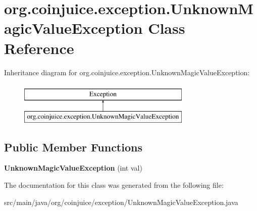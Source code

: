 \hypertarget{classorg_1_1coinjuice_1_1exception_1_1_unknown_magic_value_exception}{\section{org.\-coinjuice.\-exception.\-Unknown\-Magic\-Value\-Exception Class Reference}
\label{classorg_1_1coinjuice_1_1exception_1_1_unknown_magic_value_exception}
}
Inheritance diagram for org.\-coinjuice.\-exception.\-Unknown\-Magic\-Value\-Exception\-:\begin{figure}[H]
\begin{center}
\leavevmode
\includegraphics[height=2.000000cm]{classorg_1_1coinjuice_1_1exception_1_1_unknown_magic_value_exception}
\end{center}
\end{figure}
\subsection*{Public Member Functions}
\begin{DoxyCompactItemize}
\item 
\hypertarget{classorg_1_1coinjuice_1_1exception_1_1_unknown_magic_value_exception_abef36abcc4ae10c31bab5177c1144600}{{\bfseries Unknown\-Magic\-Value\-Exception} (int val)}\label{classorg_1_1coinjuice_1_1exception_1_1_unknown_magic_value_exception_abef36abcc4ae10c31bab5177c1144600}

\end{DoxyCompactItemize}


The documentation for this class was generated from the following file\-:\begin{DoxyCompactItemize}
\item 
src/main/java/org/coinjuice/exception/Unknown\-Magic\-Value\-Exception.\-java\end{DoxyCompactItemize}
